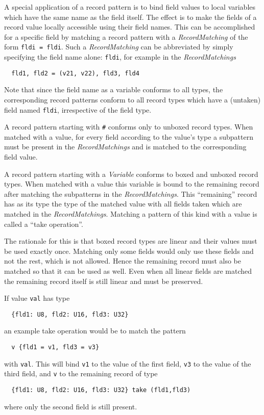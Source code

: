 \documentclass[a4paper]{report}
\newcommand{\code}[1]{\textnormal{\texttt{#1}}}
\begin{document}
A special application of a record pattern is to bind field values to local variables which have the same name as the field itself. The effect 
is to make the fields of a record value locally accessible using their field names. This can be accomplished for a specific field by matching 
a record pattern with a \textit{RecordMatching} of the form \code{fldi = fldi}. Such a \textit{RecordMatching} can be abbreviated by simply 
specifying the field name alone: \code{fldi}, for example in the \textit{RecordMatchings}
\begin{verbatim}
  fld1, fld2 = (v21, v22), fld3, fld4
\end{verbatim}
Note that since the field name as a variable conforms to all types, the corresponding record patterns conform to all record types which have a 
(untaken) field named \code{fldi}, irrespective of the field type.

\cbdelete

A record pattern starting with \code{\#} conforms only to unboxed record types. When matched with a value, \cbstart for every 
field according to the value's type a subpattern must be present in the 
\textit{RecordMatchings} and is matched to the corresponding field value. \cbend

A record pattern starting with a \textit{Variable} conforms \cbstart to boxed and unboxed record types.\cbend 
When matched with a value this variable is bound to the 
remaining record after matching the subpatterns in the \textit{RecordMatchings}. 
This ``remaining'' record has as its type the type of the 
matched value with all fields taken which are matched in the \textit{RecordMatchings}. \cbstart Matching
a pattern of this kind with a value is called a ``take operation''. \cbend

The rationale for this is that boxed record types are 
linear and their values must be used exactly once. Matching only some fields would only use these 
fields and not the rest, which is not allowed. 
Hence the remaining record must also be matched so that it can be used as well. 
Even when all linear fields are matched the remaining 
record itself is still linear and must be preserved.

\cbstart
If value \code{val} has type 
\begin{verbatim}
  {fld1: U8, fld2: U16, fld3: U32}
\end{verbatim}
an example take operation would be to match the pattern 
\begin{verbatim}
  v {fld1 = v1, fld3 = v3}
\end{verbatim}
with \code{val}. This will bind \code{v1} to the value of the first field, \code{v3} to the value of the
third field, and \code{v} to the remaining record of type
\begin{verbatim}
  {fld1: U8, fld2: U16, fld3: U32} take (fld1,fld3)
\end{verbatim}
where only the second field is still present.
\cbend
\end{document}
